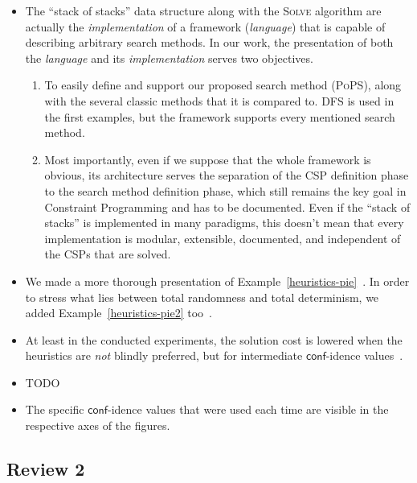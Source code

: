 \documentclass{ws-ijait}
\begin{document}
\begin{itemize}
  \item The ``stack of stacks'' data structure along with
        the \textsc{Solve} algorithm are actually the
        \emph{implementation} of a framework
        (\emph{language}) that is capable of describing
        arbitrary search methods. In our work, the
        presentation of both the \emph{language} and its
        \emph{implementation} serves two objectives.
        \begin{enumerate}
          \item To easily define and support our proposed
                search method (\textsc{PoPS}), along with
                the several classic methods that it is
                compared to. DFS is used in the first
                examples, but the framework supports every
                mentioned search method.
          \item Most importantly, even if we suppose that
                the whole framework is obvious, its
                architecture serves the separation of the
                CSP definition phase to the search method
                definition phase, which still remains the
                key goal in Constraint
                Programming\cite{Freuder2014} and has to be
                documented. Even if the ``stack of stacks''
                is implemented in many paradigms, this
                doesn't mean that every implementation is
                modular, extensible, documented, and
                independent of the CSPs that are solved.
          \end{enumerate}
  \item We made a more thorough presentation of
        Example~\ref{heuristics-pie}~. In order
        to stress what lies between total randomness and
        total determinism, we added
        Example~\ref{heuristics-pie2} too~.
  \item At least in the conducted experiments, the solution
        cost is lowered when the heuristics are \emph{not}
        blindly preferred, but for intermediate
        $\mathsf{conf}$-idence values~.
  \item TODO
  \item The specific $\mathsf{conf}$-idence values that were
        used each time are visible in the respective axes
        of the figures.
\end{itemize}

\subsection*{Review 2}
\end{document}
